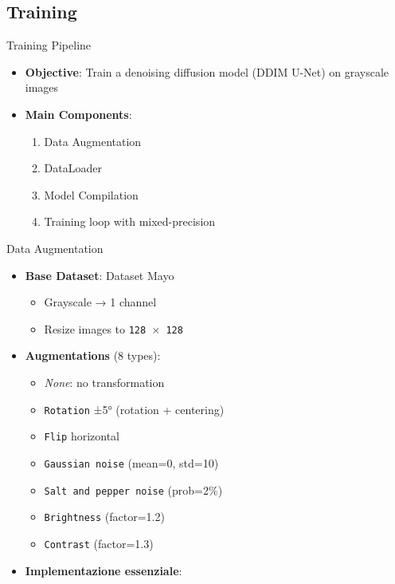 \subsection{Training}
\begin{frame}{Training Pipeline}
    \begin{itemize}
        \item \textbf{Objective}: Train a denoising diffusion model (DDIM U-Net) on grayscale images
        \item \textbf{Main Components}:
              \begin{enumerate}
                  \item Data Augmentation
                  \item DataLoader
                  \item Model Compilation
                  \item Training loop with mixed-precision
              \end{enumerate}
    \end{itemize}
\end{frame}

\begin{frame}{Data Augmentation}
    \begin{itemize}
        \item \textbf{Base Dataset}: Dataset Mayo
              \begin{itemize}
                  \item Grayscale → 1 channel
                  \item Resize images to \texttt{128 $\times$ 128}
              \end{itemize}
        \item \textbf{Augmentations} (8 types):
              \begin{itemize}
                  \item \emph{None}: no transformation
                  \item \texttt{Rotation} ±5° (rotation + centering)
                  \item \texttt{Flip} horizontal
                  \item \texttt{Gaussian noise} (mean=0, std=10)
                  \item \texttt{Salt and pepper noise} (prob=2\%)
                  \item \texttt{Brightness} (factor=1.2)
                  \item \texttt{Contrast} (factor=1.3)
              \end{itemize}
        \item \textbf{Implementazione essenziale}:
    \end{itemize}
\end{frame}

